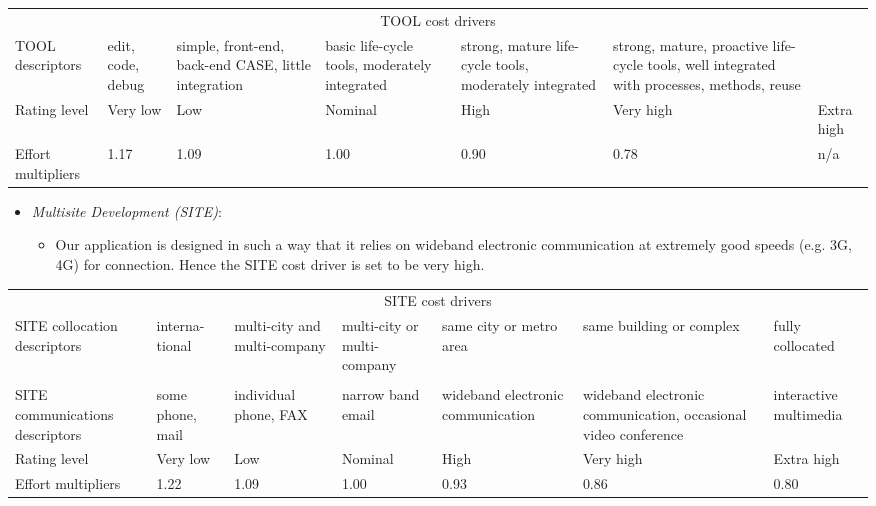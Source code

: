 \begin{table}[H]
	\hspace*{-1.7cm}
	\begin{tabular}{|p{2cm}|p{2cm}|p{2cm}|p{2cm}|p{2cm}|p{2cm}|p{2cm}|}
		\hline
		\multicolumn{7}{|c|}{TOOL cost drivers} \\
		\hhline{|=======|}
		TOOL descriptors & edit, code, debug & simple, front-end, back-end CASE, little integration & basic life-cycle tools, moderately integrated & strong, mature life-cycle tools, moderately integrated & strong, mature, proactive life-cycle tools, well integrated with processes, methods, reuse & \\
		\hline
		Rating level & Very low & Low & Nominal & High & Very high & Extra high \\
		\hline
		Effort multipliers & 1.17 & 1.09 & 1.00 & 0.90 & 0.78 & n/a \\
		\hline
	\end{tabular}
\end{table}

\begin{itemize}
	\item \emph{Multisite Development (SITE)}:
	\begin{itemize}
		\item[] Our application is designed in such a way that it relies on wideband electronic communication at extremely good speeds (e.g. 3G, 4G) for connection. Hence the SITE cost driver is set to be very high.
	\end{itemize}
\end{itemize}

\begin{table}[H]
	\hspace*{-1.7cm}
	\begin{tabular}{|p{2cm}|p{2cm}|p{2cm}|p{2cm}|p{2cm}|p{2cm}|p{2cm}|}
		\hline
		\multicolumn{7}{|c|}{SITE cost drivers} \\
		\hhline{|=======|}
		SITE collocation descriptors & interna-tional & multi-city and multi-company & multi-city or multi-company & same city or metro area & same building or complex & fully collocated \\
		&&&&&& \\
		SITE communications descriptors & some phone, mail & individual phone, FAX & narrow band email & wideband electronic communication & wideband electronic communication, occasional video conference & interactive multimedia \\
		\hline
		Rating level & Very low & Low & Nominal & High & Very high & Extra high \\
		\hline
		Effort multipliers & 1.22 & 1.09 & 1.00 & 0.93 & 0.86 & 0.80 \\
		\hline
	\end{tabular}
\end{table}

